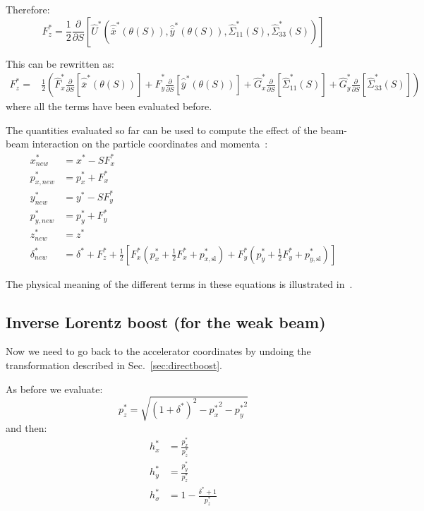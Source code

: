 Therefore:
\begin{equation}
F^*_z  =  \frac{1}{2}\frac{\partial }{\partial S} \left[
\hat{U}^*\left(\hat{\overline{x}}^*\left(\theta (S)\right), \hat{\overline{y}}^*\left(\theta (S)\right) , \hat{\Sigma}^*_{11}(S), \hat{\Sigma}^*_{33}(S)\right) 
\right]
\end{equation}

This can be rewritten as:
\begin{align}
F^*_z  =  &\frac{1}{2}\left(
\hat{F}^*_x \frac{\partial }{\partial S} \left[\hat{\overline{x}}^*\left(\theta (S)\right) \right]+
\hat{F}^*_y \frac{\partial }{\partial S} \left[\hat{\overline{y}}^*\left(\theta (S)\right) \right]+
\hat{G}^*_x\frac{\partial }{\partial S} \left[\hat{\Sigma}^*_{11}(S)\right]+
\hat{G}^*_y\frac{\partial }{\partial S} \left[\hat{\Sigma}^*_{33}(S)\right]\right)
\end{align}
where all the terms have been evaluated before.

The quantities evaluated so far can be used to compute the effect of the beam-beam interaction on the particle coordinates and momenta~\cite{hirata}:
\begin{align}
x^*_{new} &= x^* - S {F}^*_x\\
p^*_{x, new} &= p^*_{x} + {F}^*_x\\
y^*_{new} &= y^* - S {F}^*_y\\
p^*_{y, new} &= p^*_{y} + {F}^*_y\\
z^*_{new} &= z^*\\
\delta^*_{new} &= \delta^* + {F}^*_z
+\frac{1}{2}\left[ 
{F}^*_x\left(p^*_{x} + \frac{1}{2}{F}^*_x + p^*_{x,\textrm{sl}}\right)+
{F}^*_y\left(p^*_{y} + \frac{1}{2}{F}^*_y + p^*_{y,\textrm{sl}}\right)
\right]
\end{align}

The physical meaning of the different terms in these equations is illustrated in~\cite{bb6dslides}.

\subsection{Inverse Lorentz boost (for the weak beam)}

Now we need to go back to the accelerator coordinates by undoing the transformation described in Sec.~\ref{sec:directboost}.

As before we evaluate:
\begin{equation}
p^*_z  =  \sqrt{\left(1+\delta^*\right)^2-{p_x^*}^2-{p_y^*}^2}
\end{equation}
and then:
\begin{align}
h^*_x &= \frac{p^*_x}{p^*_z}\\
h^*_y &= \frac{p^*_y}{p^*_z}\\
h^*_\sigma &= 1-\frac{\delta^*+1}{p^*_z}
\end{align}

